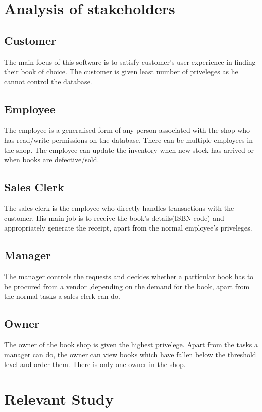 \documentclass{scrreprt}
\begin{document}
\section{Analysis of stakeholders}
\subsection{Customer}
The main focus of this software is to satisfy customer's user experience in finding their book of choice. The customer is given least number of priveleges as he cannot control the database.

\subsection{Employee}
The employee is a generalised form of any person associated with the shop who has read/write permissions on the database. There can be multiple employees in the shop. The employee can update the inventory when new stock has arrived or when books are defective/sold.

\subsection{Sales Clerk}
The sales clerk is the employee who directly handles transactions with the customer. His main job is to receive the book's details(ISBN code) and appropriately generate the receipt, apart from the normal employee's priveleges.

\subsection{Manager}
The manager controls the requests and decides whether a particular book has to be procured from a vendor ,depending on the demand for the book, apart from the normal tasks a sales clerk can do.

\subsection{Owner}
The owner of the book shop is given the highest privelege. Apart from the tasks a manager can do, the owner can view books which have fallen below the threshold level and order them. There is only one owner in the shop.
 
\section{Relevant Study} 
\end{document}
